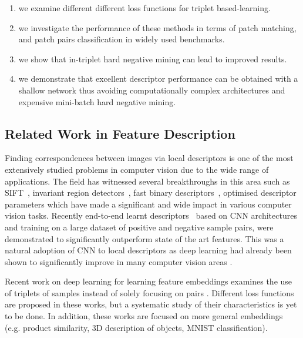 \begin{enumerate}
    \item we examine different different loss functions for triplet based-learning.
    \item we investigate the performance of these methods in terms of patch matching, and patch pairs classification in widely used benchmarks.
    \item we show that in-triplet hard negative mining can lead to improved results.
    \item we demonstrate that excellent descriptor performance can be obtained with a shallow network thus avoiding computationally complex architectures and expensive mini-batch hard negative mining.
\end{enumerate}

\subsection{Related Work in Feature Description}

Finding correspondences between images via local descriptors is one of the most extensively studied problems in computer vision due to the wide range of applications. The field has witnessed several
breakthroughs in this area such as SIFT~\cite{Lowe:2004:DIF:993451.996342}, invariant region
detectors~\cite{mikolajczykIJCV2004}, fast binary
descriptors~\cite{Calonder:2010:BBR:1888089.1888148}, optimised
descriptor parameters \cite{WHB09,simonyan2014learning} which have
made a significant and wide impact in various computer vision tasks.
Recently end-to-end learnt
descriptors~\cite{FDB14,simo2015deepdesc,ZagoruykoCVPR2015,Han_2015_CVPR}
based on CNN architectures and training on a large dataset of positive
and negative sample pairs, were demonstrated to significantly
outperform state of the art features. This was a natural adoption of
CNN to local descriptors as deep learning had already been shown to
significantly improve in many computer vision areas
\cite{lecun2015deep}.

Recent work on deep learning for learning feature embeddings examines
the use of triplets of samples instead of solely focusing on pairs
\cite{DBLP:journals/corr/WangSLRWPCW14,DBLP:journals/corr/HofferA14,wohlhart15}.
Different loss functions are proposed in these works, but a systematic
study of their characteristics is yet to be done. In addition, these
works are focused on more general embeddings (e.g. product similarity,
3D description of objects, MNIST classification).\\


